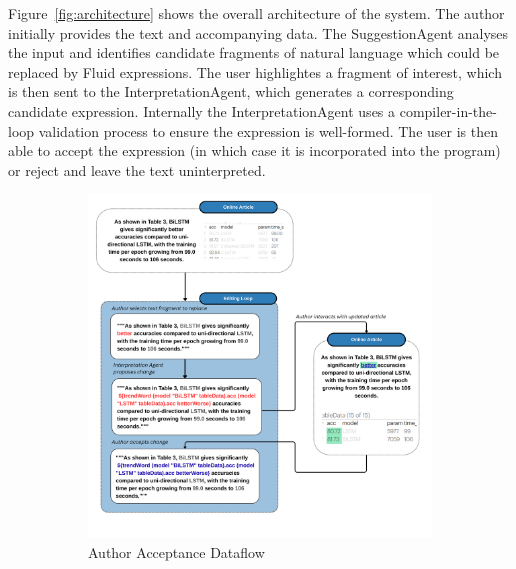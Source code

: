 Figure~\ref{fig:architecture} shows the overall architecture of the system.
The author initially provides the text and accompanying data.
The SuggestionAgent analyses the input and identifies candidate fragments of natural language which could be replaced by Fluid expressions.
The user highlightes a fragment of interest, which is then sent to the InterpretationAgent, which generates a corresponding candidate expression.
Internally the InterpretationAgent uses a compiler-in-the-loop validation process to ensure the expression is well-formed.
The user is then able to accept the expression (in which case it is incorporated into the program) or reject and leave the text uninterpreted.

\begin{figure}[ht]
    \centering
    \begin{subfigure}{0.50\linewidth}
        \centering
        \includegraphics[width=\linewidth]{fig/data-flow-correct}
        \caption{Author Acceptance Dataflow}
        \label{fig:data-flow-correct}
    \end{subfigure}\hfill
    \begin{subfigure}{0.50\linewidth}
        \centering

\end{subfigure}
\end{figure}

